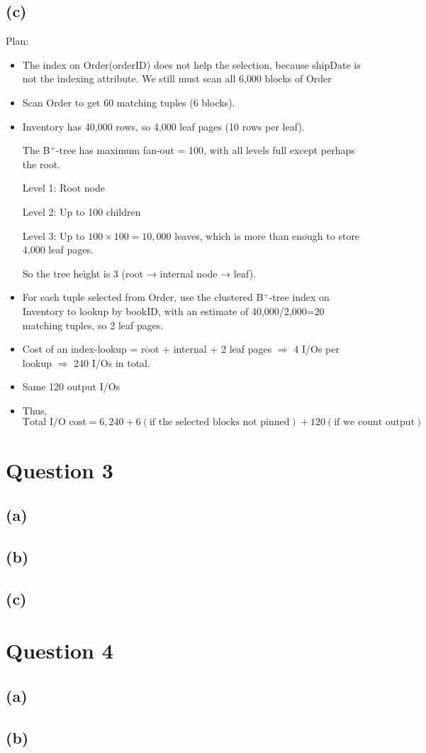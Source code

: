 \documentclass{article}
\begin{document}
\subsection*{(c)}
Plan:
\begin{itemize}
  \item The index on Order(orderID) does not help the selection, because shipDate is not the indexing attribute. We still must scan all 6{,}000 blocks of Order
  \item Scan Order to get 60 matching tuples (6 blocks).
  \item Inventory has 40,000 rows, so 4,000 leaf pages (10 rows per leaf).

        The B$^+$-tree has maximum fan-out = 100, with all levels full except perhaps the root.

        Level 1: Root node

        Level 2: Up to 100 children

        Level 3: Up to $100\times100=10,000$ leaves, which is more than enough to store 4,000 leaf pages.

        So the tree height is 3 (root → internal node → leaf).
  \item For each tuple selected from Order, use the clustered B$^+$-tree index on Inventory to lookup by bookID, with an estimate of 40{,}000/2{,}000=20 matching tuples, so 2 leaf pages.
  \item Cost of an index-lookup = root + internal + 2 leaf pages $\Rightarrow$ 4 I/Os per lookup $\Rightarrow$ 240 I/Os in total.
  \item Same 120 output I/Os
  \item Thus,
        $$
          \boxed{
            \text{Total I/O cost} = 6{,}240 + 6 (\text{if the selected blocks not pinned}) + 120(\text{if we count output})}
        $$
\end{itemize}

\newpage
\section*{Question 3}
\subsection*{(a)}

\newpage
\subsection*{(b)}

\subsection*{(c)}

\newpage
\section*{Question 4}
\subsection*{(a)}

\newpage
\subsection*{(b)}
\end{document}
